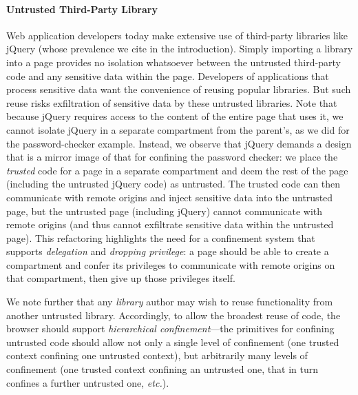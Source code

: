 \paragraph{Untrusted Third-Party Library}
Web application developers today make extensive use of third-party
libraries like jQuery (whose prevalence we cite in the
introduction). Simply importing a library into a page provides no
isolation whatsoever between the untrusted third-party code and any
sensitive data within the page. Developers of applications that
process sensitive data want the convenience of reusing popular
libraries. But such reuse risks exfiltration of sensitive data by
these untrusted libraries. Note that because jQuery requires access to
the content of the entire page that uses it, we cannot isolate jQuery
in a separate compartment from the parent's, as we did for the
password-checker example. Instead, we observe that jQuery demands a
design that is a mirror image of that for confining the password
checker: we place the {\em trusted} code for a page in a separate
compartment and deem the rest of the page (including the untrusted jQuery
code) as untrusted. The trusted code can then communicate with remote
origins and inject sensitive data into the untrusted page, but the
untrusted page (including jQuery) cannot communicate with remote
origins (and thus cannot exfiltrate sensitive data within the
untrusted page).
This refactoring highlights the need for a confinement system that
supports {\em delegation} and {\em dropping privilege}: a page should
be able to create a compartment and confer its privileges to
communicate with remote origins on that compartment, then give up
those privileges itself.

We note further that any {\em library} author
may wish to reuse functionality from another untrusted
library. Accordingly, to allow the broadest reuse of code, the browser
should support {\em hierarchical confinement}---the primitives for
confining untrusted code should allow not only a single level of
confinement (one trusted context confining one untrusted context), but
arbitrarily many levels of confinement (one trusted context confining
an untrusted one, that in turn confines a further untrusted one,
\emph{etc.}).


